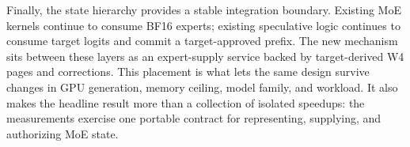 Finally, the state hierarchy provides a stable integration boundary. Existing MoE
kernels continue to consume BF16 experts; existing speculative logic continues to
consume target logits and commit a target-approved prefix. The new mechanism sits
between these layers as an expert-supply service backed by target-derived W4 pages
and corrections. This placement is what lets the same design survive changes in GPU
generation, memory ceiling, model family, and workload. It also makes the headline
result more than a collection of isolated speedups: the measurements exercise one
portable contract for representing, supplying, and authorizing MoE state.
